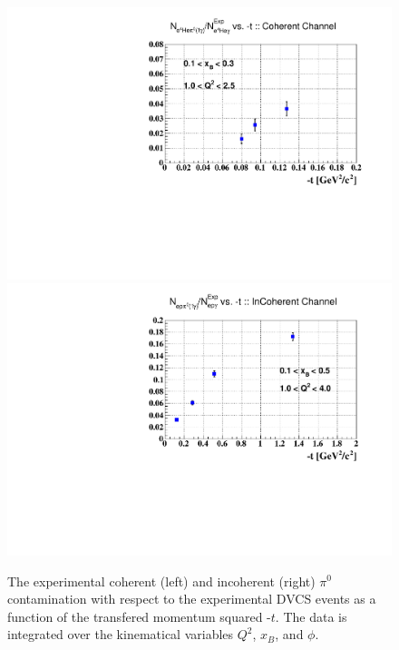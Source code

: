 \begin{figure}[tpb]
\includegraphics[scale=0.4]{fig_updated/T_ratio_pi0_dvcs_Coh_t.pdf}
\includegraphics[scale=0.4]{fig_updated/T_ratio_pi0_dvcs_InCoh_t.pdf}
\caption{The experimental coherent (left) and incoherent (right) $\pi^{0}$ 
contamination with respect to the experimental DVCS events as a function of the 
transfered momentum squared -$t$. The data is integrated over the kinematical 
variables $Q^2$, $x_B$, and $\phi$.  }
\label{fig:cont_yield}
\end{figure}





